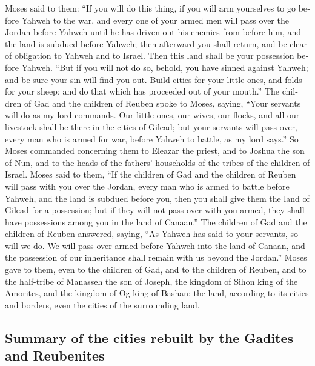 \begin{paracol}{2}
\begin{otherlanguage}{english}
 Moses said to them: ``If you will do this thing, if you
will arm yourselves to go before Yahweh to the war,  and
every one of your armed men will pass over the Jordan before Yahweh
until he has driven out his enemies from before him,  and
the land is subdued before Yahweh; then afterward you shall return, and
be clear of obligation to Yahweh and to Israel. Then this land shall be
your possession before Yahweh.  ``But if you will not do
so, behold, you have sinned against Yahweh; and be sure your sin will
find you out.  Build cities for your little ones, and
folds for your sheep; and do that which has proceeded out of your
mouth.''  The children of Gad and the children of Reuben
spoke to Moses, saying, ``Your servants will do as my lord commands.
 Our little ones, our wives, our flocks, and all our
livestock shall be there in the cities of Gilead;  but
your servants will pass over, every man who is armed for war, before
Yahweh to battle, as my lord says.''  So Moses commanded
concerning them to Eleazar the priest, and to Joshua the son of Nun, and
to the heads of the fathers' households of the tribes of the children of
Israel.  Moses said to them, ``If the children of Gad and
the children of Reuben will pass with you over the Jordan, every man who
is armed to battle before Yahweh, and the land is subdued before you,
then you shall give them the land of Gilead for a possession;
 but if they will not pass over with you armed, they
shall have possessions among you in the land of Canaan.''
 The children of Gad and the children of Reuben answered,
saying, ``As Yahweh has said to your servants, so will we do.
 We will pass over armed before Yahweh into the land of
Canaan, and the possession of our inheritance shall remain with us
beyond the Jordan.''  Moses gave to them, even to the
children of Gad, and to the children of Reuben, and to the half-tribe of
Manasseh the son of Joseph, the kingdom of Sihon king of the Amorites,
and the kingdom of Og king of Bashan; the land, according to its cities
and borders, even the cities of the surrounding land.

\hypertarget{summary-of-the-cities-rebuilt-by-the-gadites-and-reubenites}{%
\subsection{Summary of the cities rebuilt by the Gadites and
Reubenites}\label{summary-of-the-cities-rebuilt-by-the-gadites-and-reubenites}}


\end{otherlanguage}
\end{paracol}
